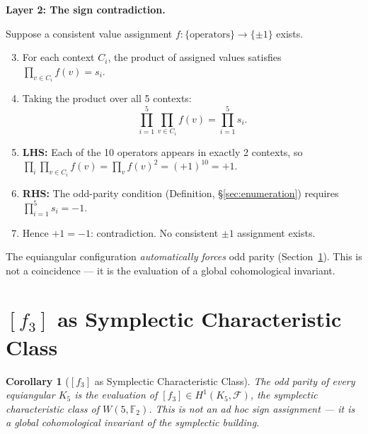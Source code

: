 \documentclass[11pt,a4paper]{article}
\newtheorem{corollary}[theorem]{Corollary}
\theoremstyle{remark}
\newcommand{\F}{\mathbb{F}}
\newcommand{\cF}{\mathcal{F}}
\begin{document}
\medskip
\noindent\textbf{Layer 2: The sign contradiction.}

Suppose a consistent value assignment $f\colon \{\text{operators}\} \to
\{\pm 1\}$ exists.

\begin{enumerate}
  \setcounter{enumi}{2}
  \item For each context $C_i$, the product of assigned values satisfies
    $\prod_{v \in C_i} f(v) = s_i$.
  \item Taking the product over all 5 contexts:
    \[
    \prod_{i=1}^{5} \prod_{v \in C_i} f(v) = \prod_{i=1}^{5} s_i.
    \]
  \item \textbf{LHS:} Each of the 10 operators appears in exactly
    2 contexts, so $\prod_{i} \prod_{v \in C_i} f(v)
    = \prod_{v} f(v)^2 = (+1)^{10} = +1$.
  \item \textbf{RHS:} The odd-parity condition (Definition,
    \S\ref{sec:enumeration}) requires $\prod_{i=1}^{5} s_i = -1$.
  \item Hence $+1 = -1$: contradiction. No consistent $\pm 1$
    assignment exists.
\end{enumerate}

\medskip
The equiangular configuration \emph{automatically forces} odd parity
(Section~\ref{sec:characteristic}).
This is not a coincidence --- it is the evaluation of a global
cohomological invariant.

\section{\texorpdfstring{$[f_3]$}{[f3]} as Symplectic Characteristic Class}
\label{sec:characteristic}

\begin{corollary}[{${[f_3]}$} as Symplectic Characteristic Class]
\label{cor:characteristic}
The odd parity of every equiangular $K_5$ is the evaluation of
$[f_3] \in H^1(K_5, \cF)$, the symplectic characteristic class of
$W(5, \F_2)$. This is not an ad hoc sign assignment --- it is a global
cohomological invariant of the symplectic building.
\end{corollary}
\end{document}
